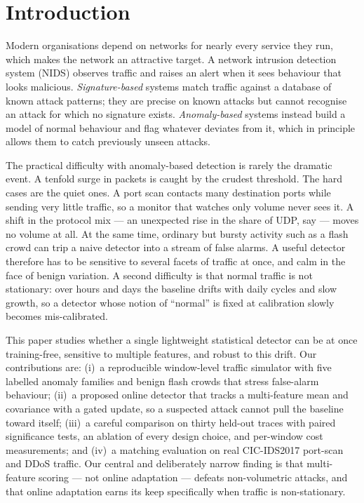 \documentclass[11pt,a4paper]{article}
\begin{document}
\section{Introduction}
Modern organisations depend on networks for nearly every service they run, which
makes the network an attractive target. A network intrusion detection system
(NIDS) observes traffic and raises an alert when it sees behaviour that looks
malicious. \emph{Signature-based} systems match traffic against a database of
known attack patterns; they are precise on known attacks but cannot recognise an
attack for which no signature exists. \emph{Anomaly-based} systems instead build
a model of normal behaviour and flag whatever deviates from it, which in principle
allows them to catch previously unseen attacks.

The practical difficulty with anomaly-based detection is rarely the dramatic
event. A tenfold surge in packets is caught by the crudest threshold. The hard
cases are the quiet ones. A port scan contacts many destination ports while
sending very little traffic, so a monitor that watches only volume never sees it.
A shift in the protocol mix --- an unexpected rise in the share of UDP, say ---
moves no volume at all. At the same time, ordinary but bursty activity such as a
flash crowd can trip a naive detector into a stream of false alarms. A useful
detector therefore has to be sensitive to several facets of traffic at once, and
calm in the face of benign variation. A second difficulty is that normal traffic
is not stationary: over hours and days the baseline drifts with daily cycles and
slow growth, so a detector whose notion of ``normal'' is fixed at calibration
slowly becomes mis-calibrated.

This paper studies whether a single lightweight statistical detector can be at
once training-free, sensitive to multiple features, and robust to this drift. Our
contributions are: (i)~a reproducible window-level traffic simulator with five
labelled anomaly families and benign flash crowds that stress false-alarm
behaviour; (ii)~a proposed online detector that tracks a multi-feature mean and
covariance with a gated update, so a suspected attack cannot pull the baseline
toward itself; (iii)~a careful comparison on thirty held-out traces with paired
significance tests, an ablation of every design choice, and per-window cost
measurements; and (iv)~a matching evaluation on real CIC-IDS2017 port-scan and
DDoS traffic. Our central and deliberately narrow finding is that multi-feature
scoring --- not online adaptation --- defeats non-volumetric attacks, and that
online adaptation earns its keep specifically when traffic is non-stationary.
\end{document}
